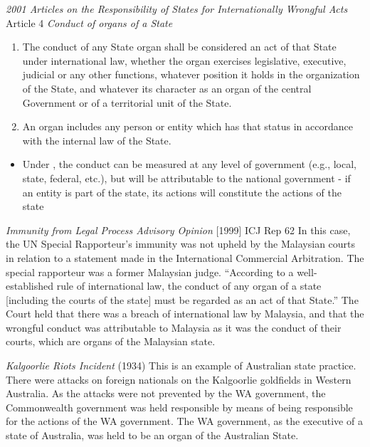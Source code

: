 \begin{conventiondetails}{\textit{2001 Articles on the Responsibility of States for Internationally Wrongful Acts} Article 4}
    \flushleft
    \textit{Conduct of organs of a State}

    \begin{enumerate}
        \item The conduct of any State organ shall be considered an act of that State under international law, whether the organ exercises legislative, executive, judicial or any other functions, whatever position it holds in the organization of the State, and whatever its character as an organ of the central Government or of a territorial unit of the State.
        \item An organ includes any person or entity which has that status in accordance with the internal law of the State.
    \end{enumerate}    
\end{conventiondetails}

\begin{itemize}
    \item Under , the conduct can be measured at any level of government (e.g., local, state, federal, etc.), but will be attributable to the national government - if an entity is part of the state, its actions will constitute the actions of the state
\end{itemize}

\begin{casedetails}{\textit{Immunity from Legal Process Advisory Opinion} [1999] ICJ Rep 62}
    \flushleft
    In this case, the UN Special Rapporteur's immunity was not upheld by the Malaysian courts in relation to a statement made in the International Commercial Arbitration. The special rapporteur was a former Malaysian judge. ``According to a well-established rule of international law, the conduct of any organ of a state [including the courts of the state] must be regarded as an act of that State.'' The Court held that there was a breach of international law by Malaysia, and that the wrongful conduct was attributable to Malaysia as it was the conduct of their courts, which are organs of the Malaysian state.
\end{casedetails}

\begin{casedetails}{\textit{Kalgoorlie Riots Incident} (1934)}
    \flushleft
    This is an example of Australian state practice. There were attacks on foreign nationals on the Kalgoorlie goldfields in Western Australia. As the attacks were not prevented by the WA government, the Commonwealth government was held responsible by means of being responsible for the actions of the WA government. The WA government, as the executive of a state of Australia, was held to be an organ of the Australian State.
\end{casedetails}

